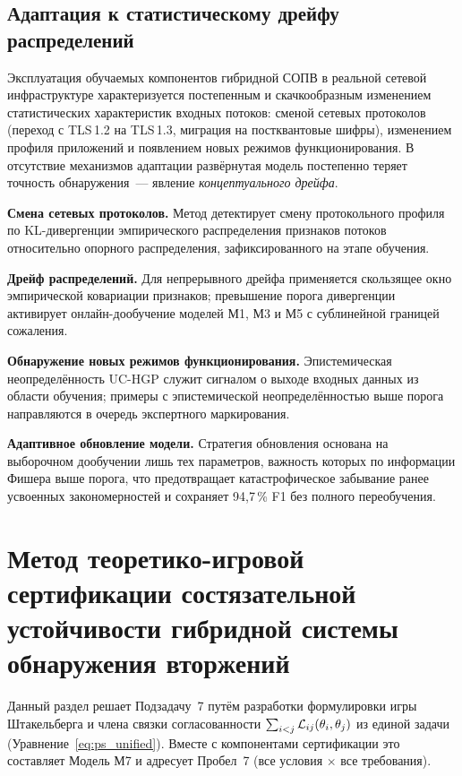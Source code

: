\subsection{Адаптация к статистическому дрейфу распределений}
\label{sec:drift_adaptation_substat}

Эксплуатация обучаемых компонентов гибридной СОПВ в реальной сетевой
инфраструктуре характеризуется постепенным и скачкообразным изменением
статистических характеристик входных потоков: сменой сетевых протоколов
(переход с TLS\,1.2 на TLS\,1.3, миграция на постквантовые шифры),
изменением профиля приложений и появлением новых режимов
функционирования. В отсутствие механизмов адаптации развёрнутая модель
постепенно теряет точность обнаружения~--- явление \emph{концептуального
дрейфа}.

\textbf{Смена сетевых протоколов.} Метод детектирует смену протокольного
профиля по KL-дивергенции эмпирического распределения признаков потоков
относительно опорного распределения, зафиксированного на этапе обучения.

\textbf{Дрейф распределений.} Для непрерывного дрейфа применяется
скользящее окно эмпирической ковариации признаков; превышение порога
дивергенции активирует онлайн-дообучение моделей М1, М3 и М5 с
сублинейной границей сожаления.

\textbf{Обнаружение новых режимов функционирования.} Эпистемическая
неопределённость UC-HGP  служит сигналом о
выходе входных данных из области обучения; примеры с эпистемической
неопределённостью выше порога направляются в очередь экспертного
маркирования.

\textbf{Адаптивное обновление модели.} Стратегия обновления основана на
выборочном дообучении лишь тех параметров, важность которых по
информации Фишера выше порога, что предотвращает катастрофическое
забывание ранее усвоенных закономерностей и сохраняет 94{,}7\,\% F1
без полного переобучения.

\section{Метод теоретико-игровой сертификации состязательной устойчивости гибридной системы обнаружения вторжений}
\label{sec:game}

Данный раздел решает Подзадачу~7 путём разработки формулировки игры Штакельберга и члена связки согласованности $\sum_{i<j}\mathcal{L}_{ij}(\theta_i,\theta_j)$ из единой задачи (Уравнение~\eqref{eq:ps_unified}). Вместе с компонентами сертификации это составляет Модель М7 и адресует Пробел~7 (все условия $\times$ все требования).

